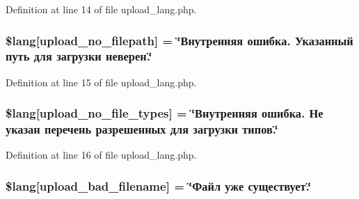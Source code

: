Definition at line 14 of file upload\+\_\+lang.\+php.

\subsubsection[{\texorpdfstring{\$lang}{$lang}}]{\setlength{\rightskip}{0pt plus 5cm}\$lang\mbox{[}\textquotesingle{}upload\+\_\+no\+\_\+filepath\textquotesingle{}\mbox{]} = \char`\"{}Внутренняя ошибка. Указанный путь для загрузки неверен.\char`\"{}}\hypertarget{application_2language_2russian_2upload__lang_8php_a3c17908c53072c6a5ef593760aaaa704}{}\label{application_2language_2russian_2upload__lang_8php_a3c17908c53072c6a5ef593760aaaa704}


Definition at line 15 of file upload\+\_\+lang.\+php.

\subsubsection[{\texorpdfstring{\$lang}{$lang}}]{\setlength{\rightskip}{0pt plus 5cm}\$lang\mbox{[}\textquotesingle{}upload\+\_\+no\+\_\+file\+\_\+types\textquotesingle{}\mbox{]} = \char`\"{}Внутренняя ошибка. Не указан перечень разрешенных для загрузки типов.\char`\"{}}\hypertarget{application_2language_2russian_2upload__lang_8php_ab188c98e583c81905dedaad54ad452bb}{}\label{application_2language_2russian_2upload__lang_8php_ab188c98e583c81905dedaad54ad452bb}


Definition at line 16 of file upload\+\_\+lang.\+php.

\subsubsection[{\texorpdfstring{\$lang}{$lang}}]{\setlength{\rightskip}{0pt plus 5cm}\$lang\mbox{[}\textquotesingle{}upload\+\_\+bad\+\_\+filename\textquotesingle{}\mbox{]} = \char`\"{}Файл уже существует.\char`\"{}}\hypertarget{application_2language_2russian_2upload__lang_8php_abb379322384f3f35952a539c63e2c8f7}{}\label{application_2language_2russian_2upload__lang_8php_abb379322384f3f35952a539c63e2c8f7}


